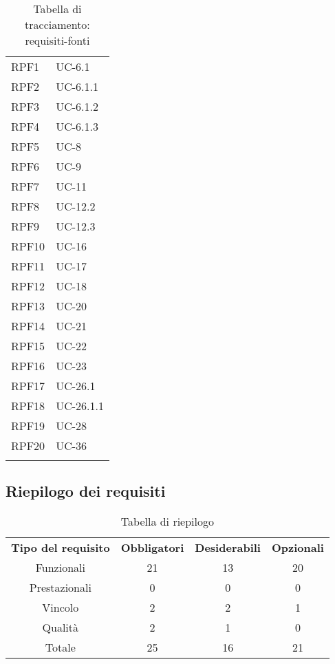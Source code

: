 \begin{longtable}{| p{5cm} | p{5cm} |}
		\rowcolor{LightGray}
		RPF1 & UC-6.1\\
		RPF2 & UC-6.1.1\\
		\rowcolor{LightGray}
		RPF3 & UC-6.1.2\\
		RPF4 & UC-6.1.3\\
		\rowcolor{LightGray}
		RPF5 & UC-8\\
		RPF6 & UC-9\\
		\rowcolor{LightGray}
		RPF7 & UC-11\\
		RPF8 & UC-12.2\\
		\rowcolor{LightGray}
		RPF9 & UC-12.3\\
		RPF10 & UC-16\\
		\rowcolor{LightGray}
		RPF11 & UC-17\\
		RPF12 & UC-18\\
		\rowcolor{LightGray}
		RPF13 & UC-20\\
		RPF14 & UC-21\\
		\rowcolor{LightGray}
		RPF15 & UC-22\\
		RPF16 & UC-23\\
		\rowcolor{LightGray}
		RPF17 & UC-26.1\\
		RPF18 & UC-26.1.1\\
		\rowcolor{LightGray}
		RPF19 & UC-28\\
		RPF20 & UC-36\\
		\rowcolor{LightGray}		
		\hline
		\caption{Tabella di tracciamento: requisiti-fonti}
\end{longtable}

\subsection{Riepilogo dei requisiti}
\begin{table}[h]
\centering
\begin{tabular}{| c | c | c | c |}
		\rowcolor{LightBlue}
		\color{white}\bfseries Tipo del requisito & \color{white}\bfseries Obbligatori & \color{white}\bfseries Desiderabili & \color{white}\bfseries Opzionali \\[0.25cm]
		 Funzionali & 21 & 13 & 20 \\
		 Prestazionali & 0 & 0 & 0 \\
		 Vincolo & 2 & 2 & 1 \\
		 Qualità & 2 & 1 & 0 \\
		 Totale & 25 & 16 & 21 \\ \hline
\end{tabular}
		\caption{Tabella di riepilogo}
\end{table}